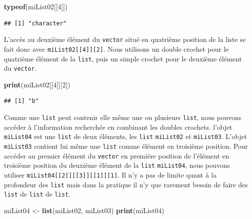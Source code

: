 \documentclass[]{book}
\newenvironment{Shaded}{\begin{snugshade}}{\end{snugshade}}
\newcommand{\DecValTok}[1]{\textcolor[rgb]{0.00,0.00,0.81}{#1}}
\newcommand{\KeywordTok}[1]{\textcolor[rgb]{0.13,0.29,0.53}{\textbf{#1}}}
\newcommand{\NormalTok}[1]{#1}
\newcommand{\StringTok}[1]{\textcolor[rgb]{0.31,0.60,0.02}{#1}}
\begin{document}
\begin{Shaded}
\begin{Highlighting}[]
\KeywordTok{typeof}\NormalTok{(miList02[[}\DecValTok{4}\NormalTok{]])}
\end{Highlighting}
\end{Shaded}

\begin{verbatim}
## [1] "character"
\end{verbatim}

L'accès au deuxième élément du \texttt{vector} situé en quatrième position de la liste se fait donc avec \texttt{miList02{[}{[}4{]}{]}{[}2{]}}. Nous utilisons un double crochet pour le quatrième élément de la \texttt{list}, puis un simple crochet pour le deuxième élément du \texttt{vector}.

\begin{Shaded}
\begin{Highlighting}[]
\KeywordTok{print}\NormalTok{(miList02[[}\DecValTok{4}\NormalTok{]][}\DecValTok{2}\NormalTok{])}
\end{Highlighting}
\end{Shaded}

\begin{verbatim}
## [1] "b"
\end{verbatim}

Comme une \texttt{list} peut contenir elle même une ou plusieurs \texttt{list}, nous pouvons accéder à l'information recherchée en combinant les doubles crochets. l'objet \texttt{miList04} est une \texttt{list} de deux éléments, les \texttt{list} \texttt{miList02} et \texttt{miList03}. L'objet \texttt{miList03} contient lui même une \texttt{list} comme élément en troisième position. Pour accéder au premier élément du \texttt{vector} en première position de l'élément en troisième position du deuxième élément de la \texttt{list} \texttt{miList04}, nous pouvons utiliser \texttt{miList04{[}{[}2{]}{]}{[}{[}3{]}{]}{[}{[}1{]}{]}{[}1{]}}. Il n'y a pas de limite quant à la profondeur des \texttt{list} mais dans la pratique il n'y que rarement besoin de faire des \texttt{list} de \texttt{list} de \texttt{list}.

\begin{Shaded}
\begin{Highlighting}[]
\NormalTok{miList04 <-}\StringTok{ }\KeywordTok{list}\NormalTok{(miList02, miList03)}
\KeywordTok{print}\NormalTok{(miList04)}
\end{Highlighting}
\end{Shaded}
\end{document}
